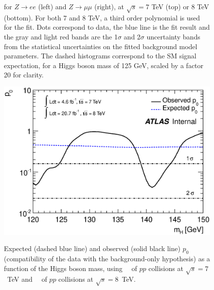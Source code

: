 \begin{figure}[!htbp]
\begin{center}
{      for $Z\to ee$ (left) and $Z\to\mu\mu$ (right), at $\sqrt{s}=7$ 
      TeV (top) or 8 TeV (bottom).
      For both 7 and 8 TeV, a third order polynomial is used for the fit.
      Dots correspond to data, the blue line is the fit result and the gray and light red
      bands are the 1$\sigma$ and 2$\sigma$ uncertainty 
      bands from the statistical uncertainties on the fitted 
      background model parameters.
      The dashed histograms correspond to the SM signal expectation,
      for a Higgs boson mass of 125 GeV, scaled by a factor 20 for clarity.
    }
    \label{fig:deltaM_data_bkgonly_fit}
  \end{center}
\end{figure}

\begin{figure}[!htbp]
\centering
    {\includegraphics[totalheight=9cm,angle=0]{figures/plot_p0}}
    \caption{Expected (dashed blue line) and observed 
      (solid black line) $p_0$ (compatibility of
      the data with the background-only hypothesis) as a function
      of the Higgs boson mass, using \lumiseventev~\ifb\ of $pp$
      collisions at $\sqrt{s}=7$~TeV and \lumieighttev~\ifb\ of $pp$
      collisions at $\sqrt{s}=8$~TeV.}
    \label{fig:ExpectedP0_1}
\end{figure}

